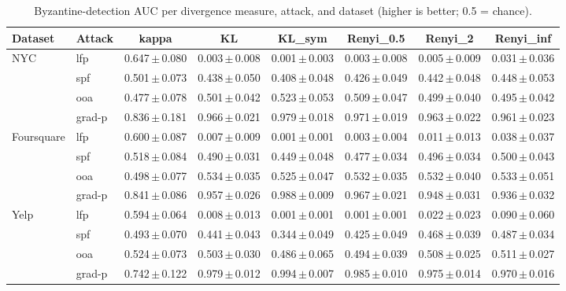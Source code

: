 \begin{table}[t]\centering\small
\caption{Byzantine-detection AUC per divergence measure, attack, and dataset (higher is better; 0.5 = chance).}
\label{tab:divergence_master}
\begin{tabular}{llcccccc}
\toprule
Dataset & Attack & kappa & KL & KL\_sym & Renyi\_0.5 & Renyi\_2 & Renyi\_inf \\
\midrule
NYC & lfp & 0.647\,$\pm$\,0.080 & 0.003\,$\pm$\,0.008 & 0.001\,$\pm$\,0.003 & 0.003\,$\pm$\,0.008 & 0.005\,$\pm$\,0.009 & 0.031\,$\pm$\,0.036 \\
 & spf & 0.501\,$\pm$\,0.073 & 0.438\,$\pm$\,0.050 & 0.408\,$\pm$\,0.048 & 0.426\,$\pm$\,0.049 & 0.442\,$\pm$\,0.048 & 0.448\,$\pm$\,0.053 \\
 & ooa & 0.477\,$\pm$\,0.078 & 0.501\,$\pm$\,0.042 & 0.523\,$\pm$\,0.053 & 0.509\,$\pm$\,0.047 & 0.499\,$\pm$\,0.040 & 0.495\,$\pm$\,0.042 \\
 & grad-p & 0.836\,$\pm$\,0.181 & 0.966\,$\pm$\,0.021 & 0.979\,$\pm$\,0.018 & 0.971\,$\pm$\,0.019 & 0.963\,$\pm$\,0.022 & 0.961\,$\pm$\,0.023 \\
\midrule
Foursquare & lfp & 0.600\,$\pm$\,0.087 & 0.007\,$\pm$\,0.009 & 0.001\,$\pm$\,0.001 & 0.003\,$\pm$\,0.004 & 0.011\,$\pm$\,0.013 & 0.038\,$\pm$\,0.037 \\
 & spf & 0.518\,$\pm$\,0.084 & 0.490\,$\pm$\,0.031 & 0.449\,$\pm$\,0.048 & 0.477\,$\pm$\,0.034 & 0.496\,$\pm$\,0.034 & 0.500\,$\pm$\,0.043 \\
 & ooa & 0.498\,$\pm$\,0.077 & 0.534\,$\pm$\,0.035 & 0.525\,$\pm$\,0.047 & 0.532\,$\pm$\,0.035 & 0.532\,$\pm$\,0.040 & 0.533\,$\pm$\,0.051 \\
 & grad-p & 0.841\,$\pm$\,0.086 & 0.957\,$\pm$\,0.026 & 0.988\,$\pm$\,0.009 & 0.967\,$\pm$\,0.021 & 0.948\,$\pm$\,0.031 & 0.936\,$\pm$\,0.032 \\
\midrule
Yelp & lfp & 0.594\,$\pm$\,0.064 & 0.008\,$\pm$\,0.013 & 0.001\,$\pm$\,0.001 & 0.001\,$\pm$\,0.001 & 0.022\,$\pm$\,0.023 & 0.090\,$\pm$\,0.060 \\
 & spf & 0.493\,$\pm$\,0.070 & 0.441\,$\pm$\,0.043 & 0.344\,$\pm$\,0.049 & 0.425\,$\pm$\,0.049 & 0.468\,$\pm$\,0.039 & 0.487\,$\pm$\,0.034 \\
 & ooa & 0.524\,$\pm$\,0.073 & 0.503\,$\pm$\,0.030 & 0.486\,$\pm$\,0.065 & 0.494\,$\pm$\,0.039 & 0.508\,$\pm$\,0.025 & 0.511\,$\pm$\,0.027 \\
 & grad-p & 0.742\,$\pm$\,0.122 & 0.979\,$\pm$\,0.012 & 0.994\,$\pm$\,0.007 & 0.985\,$\pm$\,0.010 & 0.975\,$\pm$\,0.014 & 0.970\,$\pm$\,0.016 \\

\end{tabular}
\end{table}
